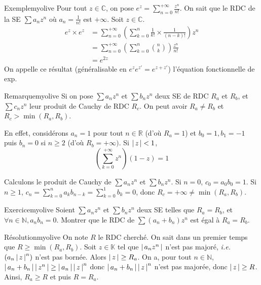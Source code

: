     \begin{omed}{Exemple}{myolive}
        Pour tout $z \in \mathbb{C}$, on pose $e^z = \sum_{n=0}^{+\infty} \frac{z^n}{n!}$. On sait que le RDC de la SE $\sum a_n z^n$ où $a_n = \frac{1}{n!}$ est $+\infty$. Soit $z \in \mathbb{C}$. 
        \begin{align*}
            e^z \times e^z 
            &= \sum_{n=0}^{+\infty} \left(\sum_{k=0}^{n} \frac{1}{k!} \times \frac{1}{(n-k)!}\right) z^n \\
            &= \sum_{n=0}^{+\infty} \left(\sum_{k=0}^{n} \binom{n }{k } \right) \frac{z^n}{n!} \\
            &= e^{2 z}
        \end{align*}
        On appelle ce résultat (généralisable en $e^z e^{z'} = e^{z + z'}$) l’équation fonctionnelle de exp.
    \end{omed}

    \begin{omed}{Remarque}{myolive}
        Si on pose $\sum a_n z^n$ et $\sum b_n z^n$ deux SE de RDC $R_a$ et $R_b$, et $\sum c_n z^n$ leur produit de Cauchy de RDC $R_c$. On peut avoir $R_a \neq R_b$ et $R_c > \min(R_a,R_b)$.

        En effet, considérons $a_n = 1$ pour tout $n \in \mathbb{R}$ (d’où $R_a = 1$) et $b_0 = 1, b_1 = -1$ puis $b_n = 0$ si $n \geq 2$ (d’où $R_b = +\infty)$. Si $\left\lvert \,z \, \right\rvert < 1$, 
        \[ \left(\sum_{k=0}^{+\infty} z^n\right)(1-z) = 1 \]    

        Calculons le produit de Cauchy de $\sum a_n z^n$ et $\sum b_n z^n$. Si $n = 0$, $c_0 = a_0 b_0 = 1$. Si $n \geq 1$, $c_n = \sum_{k=0}^{n} a_k b_{n-k} = \sum_{k=0}^{1} b_k = 0$, donc $R_c = +\infty \neq \min(R_a,R_b)$.
    \end{omed}

    \begin{omed}{Exercice}{myolive}
        Soient $\sum a_n z^n$ et $\sum b_n z^n$ deux SE telles que $R_a = R_b$, et $\forall n \in \mathbb{N}, a_n b_n = 0$. Montrer que le RDC de $\sum (a_n + b_n)z^n$ est égal à $R_a = R_b$.
    \end{omed}

    \begin{demo}{Résolution}{myolive}
        On note $R$ le RDC cherché. On sait dans un premier temps que $R \geq \min(R_a,R_b)$. Soit $z \in \mathbb{K}$ tel que $\left\lvert \,a_n z^n \, \right\rvert$ n’est pas majoré, \textit{i.e.} $\left(a_n \left\lvert \,z \, \right\rvert^n\right)$ n’est pas bornée. Alors $\left\lvert \,z \, \right\rvert \geq R_a$. On a, pour tout $n \in \mathbb{N}$, $\left\lvert \,a_n + b_n \, \right\rvert\left\lvert \,z^n \, \right\rvert \geq \left\lvert \,a_n \, \right\rvert \left\lvert \,z \, \right\rvert^n$ donc $\left\lvert \,a_n + b_n \, \right\rvert \left\lvert \,z \, \right\rvert^n$ n’est pas majorée, donc $\left\lvert \,z \, \right\rvert \geq R$. Ainsi, $R_a \geq R$ et puis $R = R_a$.
    \end{demo}

